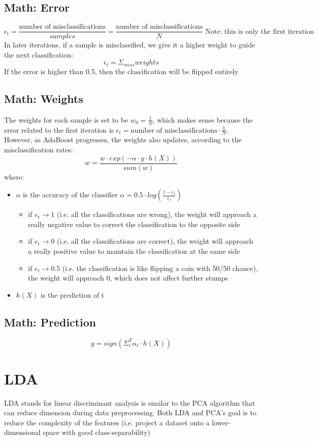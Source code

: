 \documentclass[12pt]{article}
\begin{document}
\subsection{Math: Error}
$$\epsilon_t = \frac{\text{number of misclassifications}}{samples} = \frac{\text{number of misclassifications}}{N} \text{ Note: this is only the first iteration}$$
In later iterations, if a sample is misclassified, we give it a higher weight to guide the next classification:
$$\epsilon_t = \Sigma_{miss}weights$$
If the error is higher than 0.5, then the classification will be flipped entirely

\subsection{Math: Weights}
The weights for each sample is set to be $w_0 = \frac{1}{N}$, which makes sense because the error related to the first iteration is $\epsilon_t = \text{number of misclassifications}\cdot \frac{1}{N}$. However, as AdaBoost progresses, the weights also updates, according to the misclassification rates:
$$w = \frac{w\cdot exp(-\alpha\cdot y\cdot h(X))}{sum(w)}$$
where:
\begin{itemize}
	\item $\alpha$ is the accuracy of the classifier $\alpha = 0.5\cdot log(\frac{1-e_t}{e_t})$
	\begin{itemize}
		\item if $e_t \rightarrow 1$ (i.e. all the classifications are wrong), the weight will approach a really negative value to correct the classification to the opposite side
		\item if $e_t \rightarrow 0$ (i.e. all the classifications are correct), the weight will approach a really positive value to maintain the classification at the same side
		\item if $e_t \rightarrow 0.5$ (i.e. the classification is like flipping a coin with 50/50 chance), the weight will approach 0, which does not affect further stumps
    	\end{itemize}
	\item $h(X)$ is the prediction of t
\end{itemize}

\subsection{Math: Prediction}
$$y = sign(\Sigma_t^T \alpha_t \cdot h(X))$$
\newpage

\section{LDA}
LDA stands for linear discriminant analysis is similar to the PCA algorithm that can reduce dimension during data preprocessing. Both LDA and PCA's goal is to reduce the complexity of the features (i.e. project a dataset onto a lower-dimensional space with good class-separability)
\end{document}
